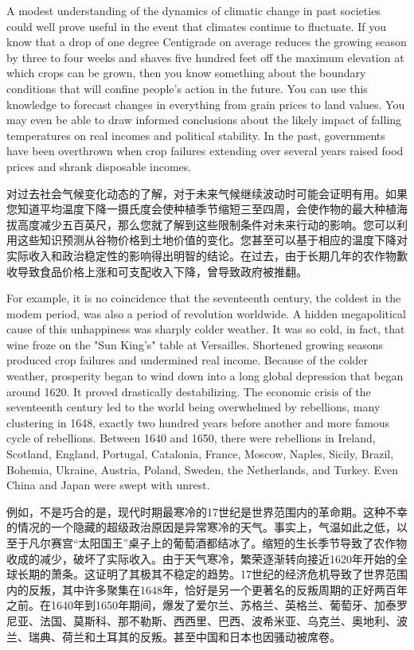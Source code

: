 \begin{Parallel}{97mm}{45mm}
  \ParallelLText
  {A modest understanding of the dynamics of climatic change in past societies could well prove useful in the event that climates continue to fluctuate. If you know that a drop of one degree Centigrade on average reduces the growing season by three to four weeks and shaves five hundred feet off the maximum elevation at which crops can be grown, then you know something about the boundary conditions that will confine people's action in the future. You can use this knowledge to forecast changes in everything from grain prices to land values. You may even be able to draw informed conclusions about the likely impact of falling temperatures on real incomes and political stability. In the past, governments have been overthrown when crop failures extending over several years raised food prices and shrank disposable incomes.}
  
  \ParallelRText
  {对过去社会气候变化动态的了解，对于未来气候继续波动时可能会证明有用。如果您知道平均温度下降一摄氏度会使种植季节缩短三至四周，会使作物的最大种植海拔高度减少五百英尺，那么您就了解到这些限制条件对未来行动的影响。您可以利用这些知识预测从谷物价格到土地价值的变化。您甚至可以基于相应的温度下降对实际收入和政治稳定性的影响得出明智的结论。在过去，由于长期几年的农作物歉收导致食品价格上涨和可支配收入下降，曾导致政府被推翻。}
  \ParallelPar


  \ParallelLText
  {For example, it is no coincidence that the seventeenth century, the coldest in the modem period, was also a period of revolution worldwide. A hidden megapolitical cause of this unhappiness was sharply colder weather. It was so cold, in fact, that wine froze on the "Sun King's" table at Versailles. Shortened growing seasons produced crop failures and undermined real income. Because of the colder weather, prosperity began to wind down into a long global depression that began around 1620. It proved drastically destabilizing. The economic crisis of the seventeenth century led to the world being overwhelmed by rebellions, many clustering in 1648, exactly two hundred years before another and more famous cycle of rebellions. Between 1640 and 1650, there were rebellions in Ireland, Scotland, England, Portugal, Catalonia, France, Moscow, Naples, Sicily, Brazil, Bohemia, Ukraine, Austria, Poland, Sweden, the Netherlands, and Turkey. Even China and Japan were swept with unrest.}
  
  \ParallelRText
  {例如，不是巧合的是，现代时期最寒冷的17世纪是世界范围内的革命期。这种不幸的情况的一个隐藏的超级政治原因是异常寒冷的天气。事实上，气温如此之低，以至于凡尔赛宫“太阳国王”桌子上的葡萄酒都结冰了。缩短的生长季节导致了农作物收成的减少，破坏了实际收入。由于天气寒冷，繁荣逐渐转向接近1620年开始的全球长期的萧条。这证明了其极其不稳定的趋势。17世纪的经济危机导致了世界范围内的反叛，其中许多聚集在1648年，恰好是另一个更著名的反叛周期的正好两百年之前。在1640年到1650年期间，爆发了爱尔兰、苏格兰、英格兰、葡萄牙、加泰罗尼亚、法国、莫斯科、那不勒斯、西西里、巴西、波希米亚、乌克兰、奥地利、波兰、瑞典、荷兰和土耳其的反叛。甚至中国和日本也因骚动被席卷。}
  \ParallelPar




\end{Parallel}
